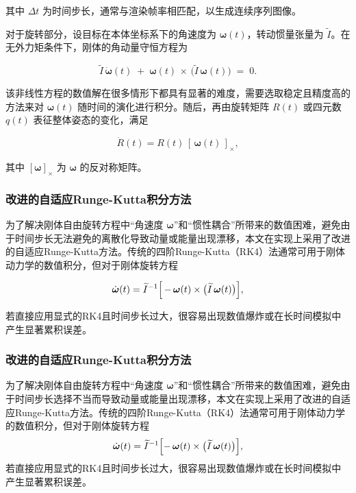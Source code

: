 其中 \(\Delta t\) 为时间步长，通常与渲染帧率相匹配，以生成连续序列图像。

对于旋转部分，设目标在本体坐标系下的角速度为 \(\boldsymbol{\omega}(t)\)，转动惯量张量为 \(\widetilde{I}\)。在无外力矩条件下，刚体的角动量守恒方程为

\begin{equation}
	\widetilde{I}\,\dot{\boldsymbol{\omega}}(t) \;+\; \boldsymbol{\omega}(t) \,\times\, \bigl(\widetilde{I}\,\boldsymbol{\omega}(t)\bigr) \;=\; 0.
\end{equation}

该非线性方程的数值解在很多情形下都具有显著的难度，需要选取稳定且精度高的方法来对 \(\boldsymbol{\omega}(t)\) 随时间的演化进行积分。随后，再由旋转矩阵 \(R(t)\) 或四元数 \(q(t)\) 表征整体姿态的变化，满足

\begin{equation}
	\dot{R}(t) = R(t)\,[\,\boldsymbol{\omega}(t)\,]_{\times},
\end{equation}

其中 \([\boldsymbol{\omega}]_{\times}\) 为 \(\boldsymbol{\omega}\) 的反对称矩阵。

\subsubsection{改进的自适应Runge-Kutta积分方法}

为了解决刚体自由旋转方程中“角速度 \(\boldsymbol{\omega}\)”和“惯性耦合”所带来的数值困难，避免由于时间步长无法避免的离散化导致动量或能量出现漂移，本文在实现上采用了改进的自适应Runge-Kutta方法。传统的四阶Runge-Kutta（RK4）法通常可用于刚体动力学的数值积分，但对于刚体旋转方程

\begin{equation}
	\dot{\boldsymbol{\omega}}(t) 
	= \widetilde{I}^{-1}\Bigl[\,-\,\boldsymbol{\omega}(t) \times \bigl(\widetilde{I}\,\boldsymbol{\omega}(t)\bigr)\Bigr],
\end{equation}

若直接应用显式的RK4且时间步长过大，很容易出现数值爆炸或在长时间模拟中产生显著累积误差。

\subsubsection{改进的自适应Runge-Kutta积分方法}

为了解决刚体自由旋转方程中“角速度 \(\boldsymbol{\omega}\)”和“惯性耦合”所带来的数值困难，避免由于时间步长选择不当而导致动量或能量出现漂移，本文在实现上采用了改进的自适应Runge-Kutta方法。传统的四阶Runge-Kutta（RK4）法通常可用于刚体动力学的数值积分，但对于刚体旋转方程
\begin{equation}
	\dot{\boldsymbol{\omega}}(t) 
	= \widetilde{I}^{-1}\Bigl[-\,\boldsymbol{\omega}(t) \times \bigl(\widetilde{I}\,\boldsymbol{\omega}(t)\bigr)\Bigr],
\end{equation}
若直接应用显式的RK4且时间步长过大，很容易出现数值爆炸或在长时间模拟中产生显著累积误差。

